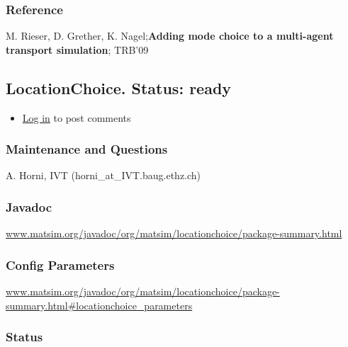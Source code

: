 \documentclass[a4paper,11pt]{report}
\begin{document}
\subsubsection{Reference}

M. Rieser, D. Grether, K. Nagel;\textbf{Adding mode choice to a multi-agent transport simulation}; TRB'09

\subsection{LocationChoice. Status: ready}
\begin{itemize}
	\item \href{http://www.matsim.org/user/login?destination=comment/reply/218%23comment-form}{Log in} to post comments
\end{itemize}

\subsubsection{\textbf{Maintenance and Questions}}

A. Horni, IVT (horni\_at\_IVT.baug.ethz.ch)

\subsubsection{\textbf{Javadoc}}

\href{http://www.matsim.org/javadoc/org/matsim/locationchoice/package-summary.html}{www.matsim.org/javadoc/org/matsim/locationchoice/package-summary.html}



\subsubsection{Config Parameters}


\href{http://www.matsim.org/javadoc/org/matsim/locationchoice/package-summary.html#locationchoice_parameters}{www.matsim.org/javadoc/org/matsim/locationchoice/package-summary.html\#locationchoice\_parameters}



\subsubsection{\textbf{Status}}
\end{document}
